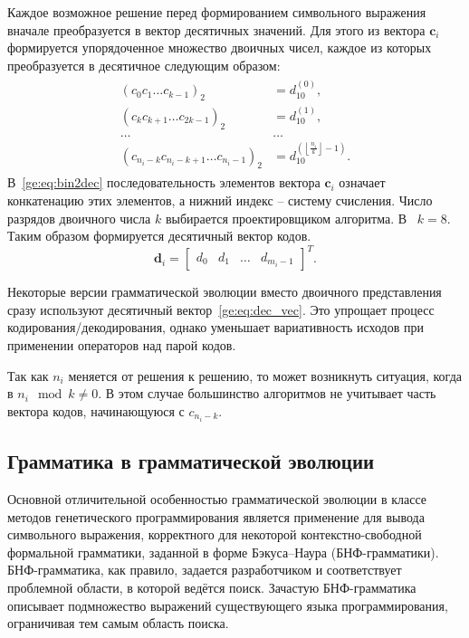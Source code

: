 Каждое возможное решение перед формированием символьного выражения вначале преобразуется в вектор десятичных значений.
Для этого из вектора $\textbf{c}_i$ формируется упорядоченное множество двоичных чисел, каждое из которых преобразуется в десятичное следующим образом:
\begin{align}
    \begin{split}
        (c_0 c_1 \dots c_{k-1})_2 & = d^{(0)}_{10}, \\
        (c_{k} c_{k+1} \dots c_{2k-1})_2 & = d^{(1)}_{10}, \\
        \dots & \dots \\
        (c_{n_i-k} c_{n_i-k+1} \dots c_{n_i-1})_2 & = d^{(\left\lfloor{\frac{n_i}{k}}\right\rfloor-1)}_{10}.
    \end{split}
    \label{ge:eq:bin2dec}
\end{align}
В~\eqref{ge:eq:bin2dec} последовательность элементов вектора $\textbf{c}_i$ означает конкатенацию этих элементов, а нижний индекс -- систему счисления. 
Число разрядов двоичного числа $k$ выбирается проектировщиком алгоритма. 
В~\cite{ONeill2003} $k = 8$.
Таким образом формируется десятичный вектор кодов.
\begin{equation}
    \mathbf{d}_i = \left[\begin{array}{cccc} d_0 & d_1 & \dots & d_{m_i-1} \end{array}\right]^T.
    \label{ge:eq:dec_vec}
\end{equation}

Некоторые версии грамматической эволюции вместо двоичного представления сразу используют десятичный вектор~\eqref{ge:eq:dec_vec}.
Это упрощает процесс кодирования/декодирования, однако уменьшает вариативность исходов при применении операторов над парой кодов.

Так как $n_i$ меняется от решения к решению, то может возникнуть ситуация, когда в $n_i \mod k \neq 0$.
В этом случае большинство алгоритмов не учитывает часть вектора кодов, начинающуюся с $c_{n_i-k}$.


\subsection{Грамматика в грамматической эволюции} \label{subsect:rules}

Основной отличительной особенностью грамматической эволюции в классе методов генетического программирования является применение для вывода символьного выражения, корректного для некоторой контекстно-свободной формальной грамматики, заданной в форме Бэкуса--Наура (БНФ-грамматики). 
БНФ-грамматика, как правило, задается разработчиком и соответствует проблемной области, в которой ведётся поиск.
Зачастую БНФ-грамматика описывает подмножество выражений существующего языка программирования, ограничивая тем самым область поиска.

